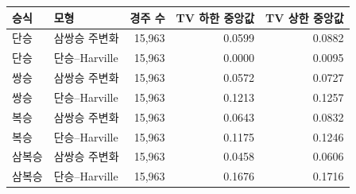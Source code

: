 \begin{tabular}{llrrr}
\toprule
승식 & 모형 & 경주 수 & TV 하한 중앙값 & TV 상한 중앙값 \\
\midrule
단승 & 삼쌍승 주변화 & 15,963 & 0.0599 & 0.0882 \\
단승 & 단승--Harville & 15,963 & 0.0000 & 0.0095 \\
\addlinespace
쌍승 & 삼쌍승 주변화 & 15,963 & 0.0572 & 0.0727 \\
쌍승 & 단승--Harville & 15,963 & 0.1213 & 0.1257 \\
\addlinespace
복승 & 삼쌍승 주변화 & 15,963 & 0.0643 & 0.0832 \\
복승 & 단승--Harville & 15,963 & 0.1175 & 0.1246 \\
\addlinespace
삼복승 & 삼쌍승 주변화 & 15,963 & 0.0458 & 0.0606 \\
삼복승 & 단승--Harville & 15,963 & 0.1676 & 0.1716 \\
\bottomrule
\end{tabular}
